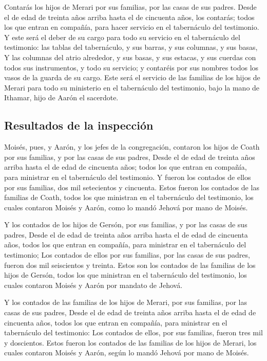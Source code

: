  Contarás los hijos de Merari por sus familias, por las
casas de sus padres.  Desde el de edad de treinta años
arriba hasta el de cincuenta años, los contarás; todos los que entran en
compañía, para hacer servicio en el tabernáculo del testimonio.
 Y este será el deber de su cargo para todo su servicio en
el tabernáculo del testimonio: las tablas del tabernáculo, y sus barras,
y sus columnas, y sus basas,  Y las columnas del atrio
alrededor, y sus basas, y sus estacas, y sus cuerdas con todos sus
instrumentos, y todo su servicio; y contaréis por sus nombres todos los
vasos de la guarda de su cargo.  Este será el servicio de
las familias de los hijos de Merari para todo su ministerio en el
tabernáculo del testimonio, bajo la mano de Ithamar, hijo de Aarón el
sacerdote.

\hypertarget{resultados-de-la-inspecciuxf3n}{%
\subsection{Resultados de la
inspección}\label{resultados-de-la-inspecciuxf3n}}

 Moisés, pues, y Aarón, y los jefes de la congregación,
contaron los hijos de Coath por sus familias, y por las casas de sus
padres,  Desde el de edad de treinta años arriba hasta el
de edad de cincuenta años; todos los que entran en compañía, para
ministrar en el tabernáculo del testimonio.  Y fueron los
contados de ellos por sus familias, dos mil setecientos y cincuenta.
 Estos fueron los contados de las familias de Coath, todos
los que ministran en el tabernáculo del testimonio, los cuales contaron
Moisés y Aarón, como lo mandó Jehová por mano de Moisés.

 Y los contados de los hijos de Gersón, por sus familias, y
por las casas de sus padres,  Desde el de edad de treinta
años arriba hasta el de edad de cincuenta años, todos los que entran en
compañía, para ministrar en el tabernáculo del testimonio; 
Los contados de ellos por sus familias, por las casas de sus padres,
fueron dos mil seiscientos y treinta.  Estos son los
contados de las familias de los hijos de Gersón, todos los que ministran
en el tabernáculo del testimonio, los cuales contaron Moisés y Aarón por
mandato de Jehová.

 Y los contados de las familias de los hijos de Merari, por
sus familias, por las casas de sus padres,  Desde el de
edad de treinta años arriba hasta el de edad de cincuenta años, todos
los que entran en compañía, para ministrar en el tabernáculo del
testimonio:  Los contados de ellos, por sus familias,
fueron tres mil y doscientos.  Estos fueron los contados de
las familias de los hijos de Merari, los cuales contaron Moisés y Aarón,
según lo mandó Jehová por mano de Moisés.

